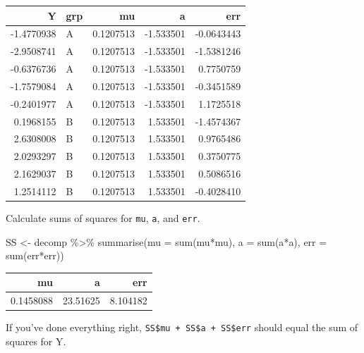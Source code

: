 \documentclass[
  oneside]{book}
\newenvironment{Shaded}{\begin{snugshade}}{\end{snugshade}}
\newcommand{\AttributeTok}[1]{\textcolor[rgb]{0.77,0.63,0.00}{#1}}
\newcommand{\DecValTok}[1]{\textcolor[rgb]{0.00,0.00,0.81}{#1}}
\newcommand{\FunctionTok}[1]{\textcolor[rgb]{0.00,0.00,0.00}{#1}}
\newcommand{\NormalTok}[1]{#1}
\newcommand{\OtherTok}[1]{\textcolor[rgb]{0.56,0.35,0.01}{#1}}
\newcommand{\SpecialCharTok}[1]{\textcolor[rgb]{0.00,0.00,0.00}{#1}}
\begin{document}
\begin{tabular}{r|l|r|r|r}
\hline
Y & grp & mu & a & err\\
\hline
-1.4770938 & A & 0.1207513 & -1.533501 & -0.0643443\\
\hline
-2.9508741 & A & 0.1207513 & -1.533501 & -1.5381246\\
\hline
-0.6376736 & A & 0.1207513 & -1.533501 & 0.7750759\\
\hline
-1.7579084 & A & 0.1207513 & -1.533501 & -0.3451589\\
\hline
-0.2401977 & A & 0.1207513 & -1.533501 & 1.1725518\\
\hline
0.1968155 & B & 0.1207513 & 1.533501 & -1.4574367\\
\hline
2.6308008 & B & 0.1207513 & 1.533501 & 0.9765486\\
\hline
2.0293297 & B & 0.1207513 & 1.533501 & 0.3750775\\
\hline
2.1629037 & B & 0.1207513 & 1.533501 & 0.5086516\\
\hline
1.2514112 & B & 0.1207513 & 1.533501 & -0.4028410\\
\hline
\end{tabular}

Calculate sums of squares for \texttt{mu}, \texttt{a}, and \texttt{err}.

\begin{Shaded}
\begin{Highlighting}[]
\NormalTok{SS }\OtherTok{\textless{}{-}}\NormalTok{ decomp }\SpecialCharTok{\%\textgreater{}\%}
  \FunctionTok{summarise}\NormalTok{(}\AttributeTok{mu =} \FunctionTok{sum}\NormalTok{(mu}\SpecialCharTok{*}\NormalTok{mu),}
            \AttributeTok{a =} \FunctionTok{sum}\NormalTok{(a}\SpecialCharTok{*}\NormalTok{a),}
            \AttributeTok{err =} \FunctionTok{sum}\NormalTok{(err}\SpecialCharTok{*}\NormalTok{err))}
\end{Highlighting}
\end{Shaded}

\begin{tabular}{r|r|r}
\hline
mu & a & err\\
\hline
0.1458088 & 23.51625 & 8.104182\\
\hline
\end{tabular}

If you've done everything right, \texttt{SS\$mu\ +\ SS\$a\ +\ SS\$err} should equal the sum of squares for Y.

\begin{Shaded}
\end{Shaded}
\end{document}
